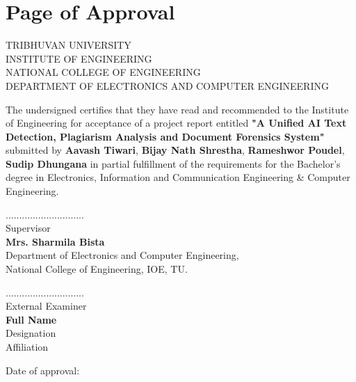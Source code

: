 \documentclass[12pt, a4paper]{report}
\numberwithin{equation}{chapter}
\begin{document}


\setcounter{page}{2}

\chapter*{Page of Approval}
\vspace{1.5cm}
\begin{center}
\uppercase{
Tribhuvan University\\
Institute of Engineering\\
National College of Engineering\\
Department of Electronics and Computer Engineering
}
\end{center}
\vspace{0.5cm}
The undersigned certifies that they have read and recommended to the Institute of Engineering for acceptance of a project report entitled \textbf{"A Unified AI Text Detection, Plagiarism Analysis and Document Forensics System"} submitted by \textbf{Aavash Tiwari}, \textbf{Bijay Nath Shrestha}, \textbf{Rameshwor Poudel}, \textbf{Sudip Dhungana} in partial fulfillment of the requirements for the Bachelor's degree in Electronics, Information and Communication Engineering \& Computer Engineering.

\vspace{1cm}
\begin{minipage}{.5\textwidth}
\raggedright
.............................\\
Supervisor\\
\textbf{Mrs. Sharmila Bista}\\
Department of Electronics and Computer Engineering,\\
National College of Engineering, IOE, TU.\\
\end{minipage}%
\begin{minipage}{0.5\textwidth}
\raggedleft
.............................\\
External Examiner\\
\textbf{Full Name}\\
Designation\\
Affiliation\\
\end{minipage}

\vspace{2cm}
\centerline{Date of approval:}
\end{document}
